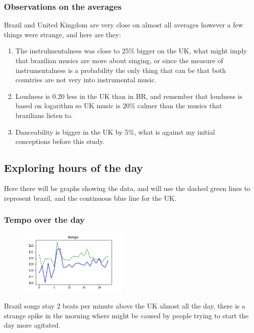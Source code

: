 \documentclass[a4paper]{article}
\begin{document}
\subsubsection{Observations on the averages}

Brazil and United Kingdom are very close on almost all averages however a few things were strange, and here are they:

\begin{enumerate}
\item The instrulmentalness was close to 25\% bigger on the UK, what might imply that brazilian musics are more about singing, or since the measure of instrumentalness is a probability the only thing that can be that both countries are not very into instrumental music.
\item Loudness is 0.20 less in the UK than in BR, and remember that loudness is based on logarithm so UK music is 20\% calmer than the musics that brazilians listen to.
\item Danceability is bigger in the UK by 5\%, what is against my initial conceptions before this study.
\end{enumerate}
\subsection{Exploring hours of the day}
Here there will be graphs showing the data, and will use the dashed green lines to represent brazil, and the continuous blue line for the UK.
\subsubsection{Tempo over the day}
\begin{figure}[h]
\centering
\includegraphics[width=200px]{tempo_daily.png}
\end{figure}
Brazil songs stay 2 beats per minute above the UK almost all the day, there is a strange spike in the morning where might be caused by people trying to start the day more agitated. 

\newpage
\end{document}

